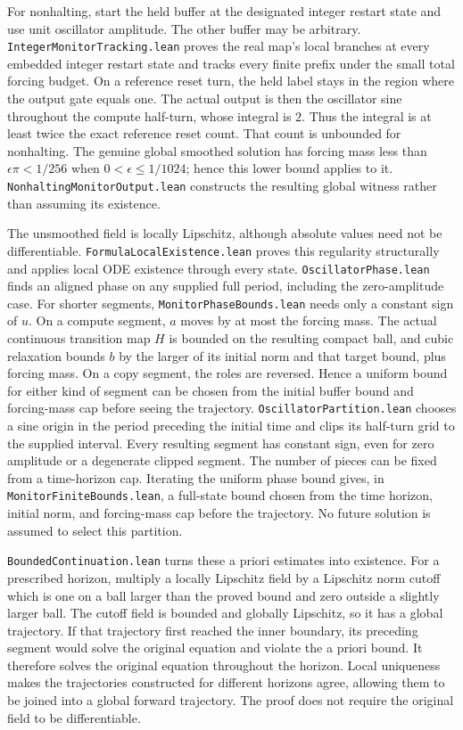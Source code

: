 \documentclass[11pt]{article}
\newcommand{\code}[1]{{\small\nolinkurl{#1}}}
\begin{document}
For nonhalting, start the held buffer at the designated integer restart
state and use unit oscillator amplitude. The other buffer may be
arbitrary. \code{IntegerMonitorTracking.lean} proves the real map's local
branches at every embedded integer restart state and tracks every finite
prefix under the small total forcing budget. On a reference reset turn,
the held label stays in the region where the output gate equals one.
The actual output is then the oscillator sine throughout the compute
half-turn, whose integral is $2$. Thus the integral is at least twice
the exact reference reset count. That count is unbounded for nonhalting.
The genuine global smoothed solution has forcing mass less than
$\epsilon\pi<1/256$ when $0<\epsilon\le1/1024$; hence this lower bound
applies to it. \code{NonhaltingMonitorOutput.lean} constructs the resulting
global witness rather than assuming its existence.

The unsmoothed field is locally Lipschitz, although absolute values need
not be differentiable. \code{FormulaLocalExistence.lean} proves this
regularity structurally and applies local ODE existence through every
state. \code{OscillatorPhase.lean} finds an aligned phase on any supplied
full period, including the zero-amplitude case. For shorter segments,
\code{MonitorPhaseBounds.lean} needs only a constant sign of $u$.
On a compute segment, $a$ moves by at most the forcing mass. The actual
continuous transition map $H$ is bounded on the resulting compact ball,
and cubic relaxation bounds $b$ by the larger of its initial norm and
that target bound, plus forcing mass. On a copy segment, the roles are
reversed. Hence a uniform bound for either kind of segment can be chosen
from the initial buffer bound and forcing-mass cap before seeing the
trajectory. \code{OscillatorPartition.lean} chooses a sine origin in the
period preceding the initial time and clips its half-turn grid to the
supplied interval. Every resulting segment has constant sign, even for
zero amplitude or a degenerate clipped segment. The number of pieces can
be fixed from a time-horizon cap. Iterating the uniform phase bound gives,
in \code{MonitorFiniteBounds.lean}, a full-state bound chosen from the
time horizon, initial norm, and forcing-mass cap before the trajectory.
No future solution is assumed to select this partition.

\code{BoundedContinuation.lean} turns these a priori estimates into
existence. For a prescribed horizon, multiply a locally Lipschitz field
by a Lipschitz norm cutoff which is one on a ball larger than the proved
bound and zero outside a slightly larger ball. The cutoff field is
bounded and globally Lipschitz, so it has a global trajectory. If that
trajectory first reached the inner boundary, its preceding segment would
solve the original equation and violate the a priori bound. It therefore
solves the original equation throughout the horizon. Local uniqueness
makes the trajectories constructed for different horizons agree, allowing
them to be joined into a global forward trajectory. The proof does not
require the original field to be differentiable.
\end{document}

